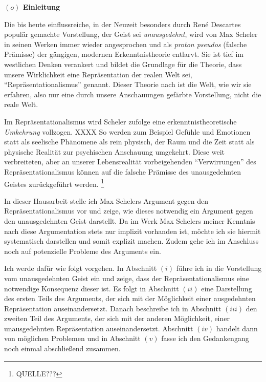 \documentclass[a4paper, 12pt]{article}
\begin{document}
\begin{onehalfspace} 

\noindent\textbf{$(o)$ Einleitung}

\noindent Die bis heute einflussreiche, in der Neuzeit besonders durch Ren\'e Descartes populär gemachte Vorstellung, der Geist sei \emph{unausgedehnt}, wird von Max Scheler in seinen Werken immer wieder angesprochen und als \emph{proton pseudos} (falsche Prämisse) der gängigen, modernen Erkenntnistheorie entlarvt. Sie ist tief im westlichen Denken verankert und bildet die Grundlage für die Theorie, dass unsere Wirklichkeit eine Repräsentation der realen Welt sei, "`Repräsentationalismus"' genannt. Dieser Theorie nach ist die Welt, wie wir sie erfahren, also nur eine durch unsere Anschauungen gefärbte Vorstellung, nicht die reale Welt.

Im Repräsentationalismus wird Scheler zufolge eine erkenntnistheoretische \emph{Umkehrung} vollzogen. XXXX So werden zum Beispiel Gefühle und Emotionen statt als seelische Phänomene als rein physisch, der Raum und die Zeit statt als physische Realität zur psychischen Anschauung umgekehrt. Diese weit verbreiteten, aber an unserer Lebensrealität vorbeigehenden "`Verwirrungen"' des Repräsentationalismus können auf die falsche Prämisse des unausgedehnten Geistes zurück\-geführt werden. \footnote{QUELLE???}

In dieser Hausarbeit stelle ich Max Schelers Argument gegen den Repräsentationalismus vor und zeige, wie dieses notwendig ein Argument gegen den unausgedehnten Geist darstellt. Da im Werk Max Schelers meiner Kenntnis nach diese Argumentation stets nur implizit vorhanden ist, möchte ich sie hiermit systematisch darstellen und somit explizit machen. Zudem gehe ich im Anschluss noch auf potenzielle Probleme des Arguments ein. 

\vspace{3mm}

Ich werde dafür wie folgt vorgehen. In Abschnitt $(i)$ führe ich in die Vorstellung vom unausgedehnten Geist ein und zeige, dass der Repräsentationalismus eine notwendige Konsequenz dieser ist. Es folgt in Abschnitt $(ii)$ eine Darstellung des ersten Teils des Arguments, der sich mit der Möglichkeit einer ausgedehnten Repräsentation auseinandersetzt. Danach beschreibe ich in Abschnitt $(iii)$ den zweiten Teil des Arguments, der sich mit der anderen Möglichkeit, einer unausgedehnten Repräsentation auseinandersetzt. Abschnitt $(iv)$ handelt dann von möglichen Problemen und in Abschnitt $(v)$ fasse ich den Gedankengang noch einmal abschließend zusammen.


\end{onehalfspace}
\end{document}
